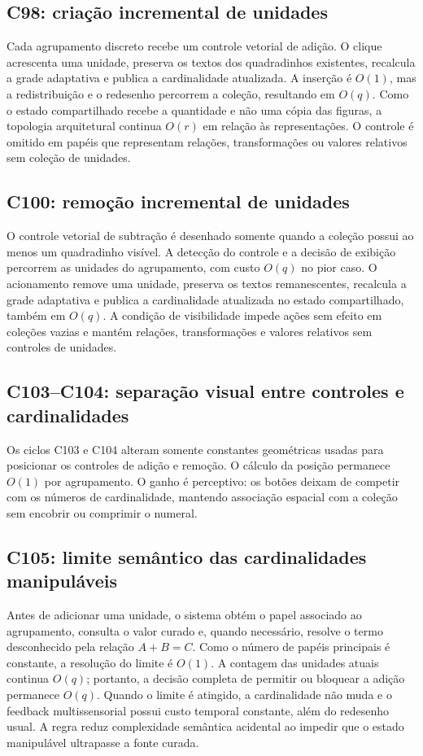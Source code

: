 \documentclass[12pt,a4paper]{article}
\begin{document}
\subsection{C98: criação incremental de unidades}
Cada agrupamento discreto recebe um controle vetorial de adição. O clique acrescenta uma unidade, preserva os textos dos quadradinhos existentes, recalcula a grade adaptativa e publica a cardinalidade atualizada. A inserção é $O(1)$, mas a redistribuição e o redesenho percorrem a coleção, resultando em $O(q)$. Como o estado compartilhado recebe a quantidade e não uma cópia das figuras, a topologia arquitetural continua $O(r)$ em relação às representações. O controle é omitido em papéis que representam relações, transformações ou valores relativos sem coleção de unidades.

\subsection{C100: remoção incremental de unidades}
O controle vetorial de subtração é desenhado somente quando a coleção possui ao menos um quadradinho visível. A detecção do controle e a decisão de exibição percorrem as unidades do agrupamento, com custo $O(q)$ no pior caso. O acionamento remove uma unidade, preserva os textos remanescentes, recalcula a grade adaptativa e publica a cardinalidade atualizada no estado compartilhado, também em $O(q)$. A condição de visibilidade impede ações sem efeito em coleções vazias e mantém relações, transformações e valores relativos sem controles de unidades.

\subsection{C103--C104: separação visual entre controles e cardinalidades}
Os ciclos C103 e C104 alteram somente constantes geométricas usadas para posicionar os controles de adição e remoção. O cálculo da posição permanece $O(1)$ por agrupamento. O ganho é perceptivo: os botões deixam de competir com os números de cardinalidade, mantendo associação espacial com a coleção sem encobrir ou comprimir o numeral.

\subsection{C105: limite semântico das cardinalidades manipuláveis}
Antes de adicionar uma unidade, o sistema obtém o papel associado ao agrupamento, consulta o valor curado e, quando necessário, resolve o termo desconhecido pela relação $A+B=C$. Como o número de papéis principais é constante, a resolução do limite é $O(1)$. A contagem das unidades atuais continua $O(q)$; portanto, a decisão completa de permitir ou bloquear a adição permanece $O(q)$. Quando o limite é atingido, a cardinalidade não muda e o feedback multissensorial possui custo temporal constante, além do redesenho usual. A regra reduz complexidade semântica acidental ao impedir que o estado manipulável ultrapasse a fonte curada.
\end{document}
